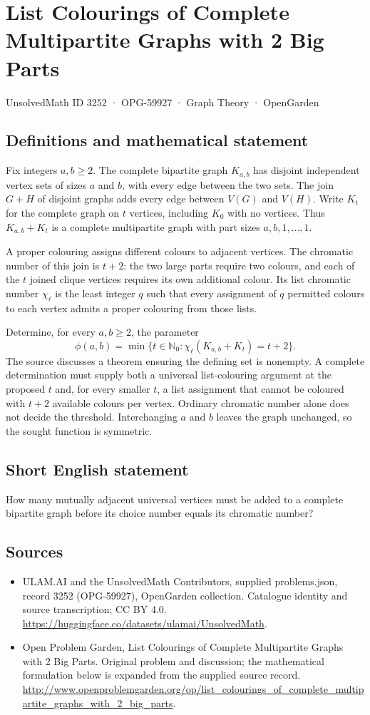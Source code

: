 \documentclass[11pt,a4paper]{article}
\begin{document}
\section*{List Colourings of Complete Multipartite Graphs with 2 Big Parts}\label{3252}
{\small UnsolvedMath ID 3252 · OPG-59927 · Graph Theory · OpenGarden}
\subsection{Definitions and mathematical statement}
Fix integers $a,b\ge2$. The complete bipartite graph $K_{a,b}$ has disjoint
independent vertex sets of sizes $a$ and $b$, with every edge between the
two sets. The join $G+H$ of disjoint graphs adds every edge between
$V(G)$ and $V(H)$. Write $K_t$ for the complete graph on $t$ vertices,
including $K_0$ with no vertices. Thus $K_{a,b}+K_t$ is a complete
multipartite graph with part sizes $a,b,1,\ldots,1$.

A proper colouring assigns different colours to adjacent vertices.
The chromatic number of this join is $t+2$: the two large parts require
two colours, and each of the $t$ joined clique vertices requires its own
additional colour. Its list chromatic number $\chi_\ell$ is the least
integer $q$ such that every assignment of $q$ permitted colours to each
vertex admits a proper colouring from those lists.

Determine, for every $a,b\ge2$, the parameter
\[
 \phi(a,b)=\min\{t\in\mathbb N_0:
                 \chi_\ell(K_{a,b}+K_t)=t+2\}.
\]
The source discusses a theorem ensuring the defining set is nonempty.
A complete determination must supply both a universal list-colouring
argument at the proposed $t$ and, for every smaller $t$, a list assignment
that cannot be coloured with $t+2$ available colours per vertex. Ordinary
chromatic number alone does not decide the threshold. Interchanging $a$
and $b$ leaves the graph unchanged, so the sought function is symmetric.
\subsection{Short English statement}
How many mutually adjacent universal vertices must be added to a complete bipartite graph before its choice number equals its chromatic number?
\subsection{Sources}
\begin{itemize}
\item[S1] ULAM.AI and the UnsolvedMath Contributors, supplied problems.json, record 3252 (OPG-59927), OpenGarden collection. Catalogue identity and source transcription; CC BY 4.0.
\url{https://huggingface.co/datasets/ulamai/UnsolvedMath}.
\item[S2] Open Problem Garden, List Colourings of Complete Multipartite Graphs with 2 Big Parts. Original problem and discussion; the mathematical formulation below is expanded from the supplied source record.
\url{http://www.openproblemgarden.org/op/list_colourings_of_complete_multipartite_graphs_with_2_big_parts}.
\end{itemize}
\end{document}
